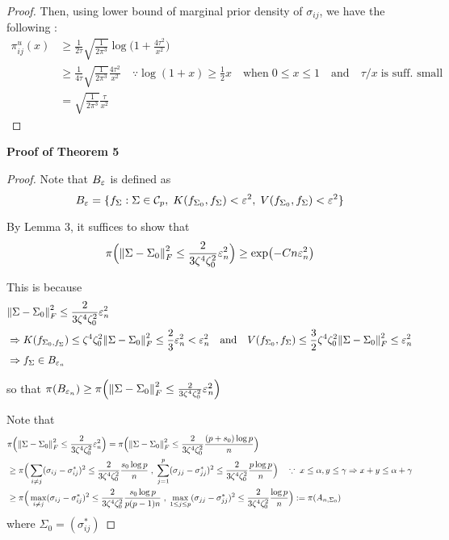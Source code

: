 \begin{proof}
    Then, using lower bound of marginal prior density of $\sigma_{ij}$, we have the following :
    \begin{align*}
        \pi_{ij}^u(x) &\geq \frac{1}{2\tau}\sqrt{\frac{1}{2\pi^3}}\log\Big(1+\frac{4\tau^2}{x^2}\Big) \\ 
        &\geq \frac{1}{4\tau}\sqrt{\frac{1}{2\pi^3}}\frac{4\tau^2}{x^2} \quad \because \log(1+x)\geq \frac 12 x \quad \text{when} \; 0\leq x \leq 1 \quad \text{and} \quad \tau/x \; \text{is suff. small} \\
        &= \sqrt{\frac{1}{2\pi^3}}\frac{\tau}{x^2}
    \end{align*}
\end{proof}

\noindent \textbf{Proof of Theorem 5}
\begin{proof}
    Note that $B_{\varepsilon}$ is defined as \[B_\varepsilon = \{f_\Sigma : \Sigma \in \mathcal{C}_p , \; K(f_{\Sigma_0}, f_\Sigma)< \varepsilon^2 , \; V(f_{\Sigma_0}, f_\Sigma)< \varepsilon^2 \}\]

    By Lemma 3, it suffices to show that \[\pi\Big(\norm{\Sigma- \Sigma_0}_F^2 \leq \frac{2}{3\zeta^4\zeta_0^2}\varepsilon_n^2\Big)\geq \exp(-Cn\varepsilon_n^2)\] 

    This is because 
    \begin{align*}
        &\norm{\Sigma- \Sigma_0}_F^2 \leq \frac{2}{3\zeta^4\zeta_0^2}\varepsilon_n^2 \\ 
        &\Rightarrow K(f_{\Sigma_0, f_\Sigma}) \leq \zeta^4\zeta_0^2 \norm{\Sigma - \Sigma_0}_F^2 \leq \frac 23 \varepsilon_n^2 < \varepsilon_n^2 \quad \text{and} \quad V(f_{\Sigma_0}, f_\Sigma) \leq \frac 32 \zeta^4\zeta_0^2 \norm{\Sigma - \Sigma_0}_F^2 \leq \varepsilon_n^2 \\
        &\Rightarrow f_\Sigma \in B_{\varepsilon_n}
    \end{align*}

    so that $\pi(B_{\varepsilon_n}) \geq \pi\Big(\norm{\Sigma- \Sigma_0}_F^2 \leq \frac{2}{3\zeta^4\zeta_0^2}\varepsilon_n^2\Big)$

    Note that 
    \begin{align*}
        &\pi\Big(\norm{\Sigma- \Sigma_0}_F^2 \leq \frac{2}{3\zeta^4\zeta_0^2}\varepsilon_n^2\Big) = \pi\Big(\norm{\Sigma- \Sigma_0}_F^2 \leq \frac{2}{3\zeta^4\zeta_0^2} \frac{(p+s_0)\log p}{n} \Big) \\
        &\geq \pi\Big( \sum_{i\neq j}(\sigma_{ij} - \sigma_{ij}^*)^2 \leq \frac{2}{3\zeta^4\zeta_0^2}\frac{s_0\log p}{n} \;, \; \sum_{j=1}^p(\sigma_{jj} - \sigma_{jj}^*)^2 \leq \frac{2}{3\zeta^4\zeta_0^2}\frac{p\log p}{n} \Big) \quad \because \; x\leq \alpha, y \leq \gamma \Rightarrow x+y \leq \alpha + \gamma \\ 
        &\geq \pi\Big(\max_{i\neq j}(\sigma_{ij}- \sigma_{ij}^*)^2\leq \frac{2}{3\zeta^4\zeta_0^2}\frac{s_0\log p}{p(p-1)n} \;,\; \max_{1\leq j\leq p}(\sigma_{jj}- \sigma_{jj}^*)^2 \leq \frac{2}{3\zeta^4 \zeta_0^2}\frac{\log p}{n} \Big) := \pi(A_{n, \Sigma_0})
    \end{align*}
    where $\Sigma_0 = (\sigma_{ij}^*)$


\end{proof}
